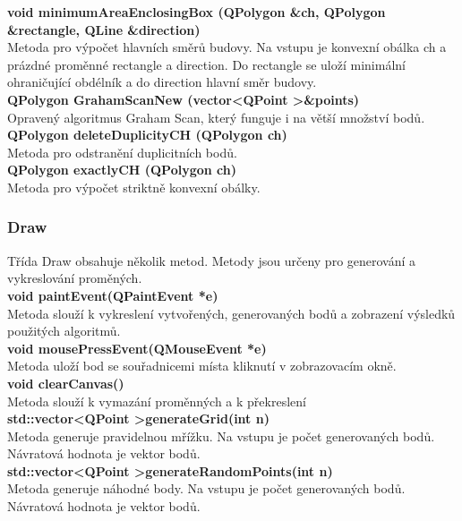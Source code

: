 \documentclass[a4paper, 12pt]{article}
\begin{document}
\textbf{void minimumAreaEnclosingBox (QPolygon \&ch, QPolygon \&rectangle, QLine \&direction)}\\
Metoda pro výpočet hlavních směrů budovy. Na vstupu je konvexní obálka ch a prázdné proměnné rectangle a direction. Do rectangle se uloží minimální ohraničující obdélník a do direction hlavní směr budovy.
\\

\textbf{QPolygon GrahamScanNew (vector\textless QPoint \textgreater \&points)}\\
Opravený algoritmus Graham Scan, který funguje i na větší množství bodů.
\\

\textbf{QPolygon deleteDuplicityCH (QPolygon ch)}\\
Metoda pro odstranění duplicitních bodů.
\\

\textbf{QPolygon exactlyCH (QPolygon ch)}\\
Metoda pro výpočet striktně konvexní obálky.
\\

\subsubsection{Draw}
Třída Draw obsahuje několik metod. Metody jsou určeny pro generování a vykreslování proměných.
\\

\textbf{void paintEvent(QPaintEvent *e)}\\
Metoda slouží k vykreslení vytvořených, generovaných bodů a zobrazení výsledků použitých algoritmů.
\\

\textbf{void mousePressEvent(QMouseEvent *e)}\\
Metoda uloží bod se souřadnicemi místa kliknutí v zobrazovacím okně.
\\

\textbf{void clearCanvas()}\\
Metoda slouží k vymazání proměnných a k překreslení
\\

\textbf{std::vector\textless QPoint \textgreater generateGrid(int n)}\\
Metoda generuje pravidelnou mřížku. Na vstupu je počet generovaných bodů. Návratová hodnota je vektor bodů.\\

\textbf{std::vector\textless QPoint \textgreater generateRandomPoints(int n)}\\
Metoda generuje náhodné body. Na vstupu je počet generovaných bodů. Návratová hodnota je vektor bodů.\\
\end{document}
